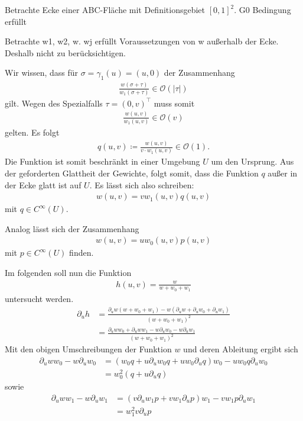 \documentclass[10pt,a4paper,oneside]{report}
\newcommand{\OL}{\mathcal{O}}
\begin{document}
Betrachte Ecke einer ABC-Fläche mit Definitionsgebiet $\left[0,1\right]^2$.
G0 Bedingung erfüllt

Betrachte w1, w2, w.
wj erfüllt Voraussetzungen von w außerhalb der Ecke. Deshalb nicht zu berücksichtigen.

Wir wissen, dass für $\sigma = \gamma_1\left(u\right) = \left(u,0\right)$ der Zusammenhang
\begin{align*}
\frac{w\left(\sigma + \tau\right)}{w_1\left(\sigma + \tau\right)} \in \OL\left(|\tau|\right)
\end{align*}
gilt.
Wegen des Spezialfalls $\tau = \left( 0, v\right)^{\top}$ muss somit
\begin{align*}
\frac{w\left(u,v\right)}{w_1\left(u,v\right)} \in \OL\left(v\right)
\end{align*}
gelten.
Es folgt
\begin{align*}
q\left(u,v\right) \coloneqq \frac{w\left(u,v\right)}{v \cdot w_1\left(u,v\right)} \in \OL\left(1\right).
\end{align*}
Die Funktion ist somit beschränkt in einer Umgebung $U$ um den Ursprung. 
Aus der geforderten Glattheit der Gewichte, folgt somit, dass die Funktion $q$ außer in der Ecke glatt ist auf $U$.
Es lässt sich also schreiben:
\begin{align*}
w\left(u,v\right) = v w_1\left(u,v\right) q\left(u,v\right)
\end{align*}
mit $q \in C^\infty\left(U\right)$.

Analog lässt sich der Zusammenhang
\begin{align*}
w\left(u,v\right) = u w_0\left(u,v\right) p\left(u,v\right)
\end{align*}
mit $p \in C^\infty\left(U\right)$ finden.

Im folgenden soll nun die Funktion
\begin{align*}
h\left(u,v\right) = \frac{w}{w + w_0 + w_1}
\end{align*}
untersucht werden.
\begin{align*}
\partial_u h &= \frac{\partial_u w \left(w+w_0+w_1\right) - w \left( \partial_u w + \partial_u w_0 +\partial_u w_1\right)}{\left(w+w_0+w_1\right)^2} \\
&= \frac{\partial_u w w_0+ \partial_u w w_1 - w \partial_u w_0 - w \partial_u w_1}{\left(w+w_0+w_1\right)^2}
\end{align*}
Mit den obigen Umschreibungen der Funktion $w$ und deren Ableitung ergibt sich
\begin{align*}
\partial_u w w_0 - w \partial_u w_0 &= \left(w_0 q + u \partial_u w_0 q +u w_0 \partial_u q \right) w_0 - u w_0 q \partial_u w_0 \\
&= w_0^2 \left(q+u\partial_u q\right)
\end{align*}
sowie 
\begin{align*}
\partial_u w w_1 - w \partial_u w_1 &= \left(v \partial_u w_1 p + v w_1 \partial_u p\right) w_1 - v w_1 p \partial_u w_1 \\
&= w_1^2 v \partial_u p
\end{align*}
\end{document}
